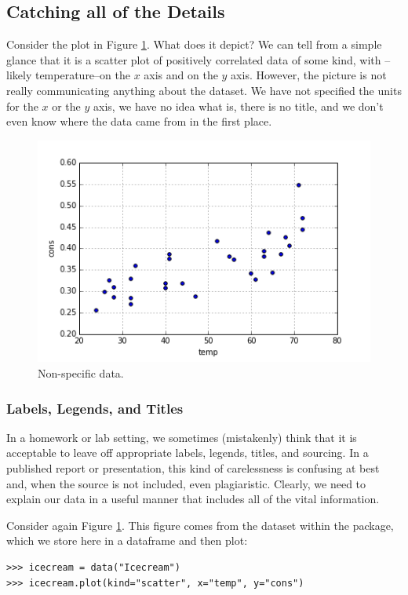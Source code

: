 \subsection*{Catching all of the Details}

Consider the plot in Figure \ref{fig:nolabels}.
What does it depict?
We can tell from a simple glance that it is a scatter plot of positively correlated data of some kind, with --likely temperature--on the $x$ axis and  on the $y$ axis.
However, the picture is not really communicating anything about the dataset. We have not specified the units for the $x$ or the $y$ axis, we have no idea what  is, there is no title, and we don't even know where the data came from in the first place.

\begin{figure}[H]
    \centering
    \includegraphics[width=.75\textwidth]{Nolabels.png}
    \caption{Non-specific data.}
    \label{fig:nolabels}
\end{figure}

\subsubsection*{Labels, Legends, and Titles}
In a homework or lab setting, we sometimes (mistakenly) think that it is acceptable to leave off appropriate labels, legends, titles, and sourcing.
In a published report or presentation, this kind of carelessness is confusing at best and, when the source is not included, even plagiaristic.
Clearly, we need to explain our data in a useful manner that includes all of the vital information.

Consider again Figure \ref{fig:nolabels}.
This figure comes from the  dataset within the  package, which we store here in a dataframe and then plot:
\begin{lstlisting}
>>> icecream = data("Icecream")
>>> icecream.plot(kind="scatter", x="temp", y="cons")
\end{lstlisting}

